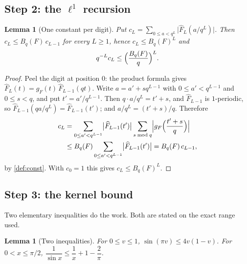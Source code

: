 \documentclass[11pt]{amsart}
\newtheorem{lemma}[theorem]{Lemma}
\theoremstyle{definition}
\theoremstyle{remark}
\begin{document}
\subsection*{Step 2: the $\ell^1$ recursion}

\begin{lemma}[One constant per digit]
\label{lem:l1}
Put $c_L = \sum_{0 \le a < q^L} \bigl| \widehat F_L(a/q^L) \bigr|$. Then $c_L \le B_q(F)\, c_{L-1}$ for every $L \ge 1$, hence $c_L \le B_q(F)^L$ and
\[
  q^{-L} c_L \le \Bigl( \frac{B_q(F)}{q} \Bigr)^{L} .
\]
\end{lemma}

\begin{proof}
Peel the digit at position $0$: the product formula gives $\widehat F_L(t) = g_F(t)\, \widehat F_{L-1}(qt)$. Write $a = a' + s q^{L-1}$ with $0 \le a' < q^{L-1}$ and $0 \le s < q$, and put $t' = a'/q^{L-1}$. Then $q \cdot a/q^L = t' + s$, and $\widehat F_{L-1}$ is $1$-periodic, so $\widehat F_{L-1}(q a / q^L) = \widehat F_{L-1}(t')$; and $a/q^L = (t' + s)/q$. Therefore
\begin{align*}
  c_L &= \sum_{0 \le a' < q^{L-1}} \bigl| \widehat F_{L-1}(t') \bigr| \sum_{s \bmod q} \Bigl| g_F\Bigl( \frac{t' + s}{q} \Bigr) \Bigr| \\
  &\le B_q(F) \sum_{0 \le a' < q^{L-1}} \bigl| \widehat F_{L-1}(t') \bigr| = B_q(F)\, c_{L-1},
\end{align*}
by \cref{def:const}. With $c_0 = 1$ this gives $c_L \le B_q(F)^L$.
\end{proof}

\subsection*{Step 3: the kernel bound}

Two elementary inequalities do the work. Both are stated on the exact range used.

\begin{lemma}[Two inequalities]
\label{lem:elem}
For $0 \le v \le 1$, $\sin(\pi v) \le 4v(1-v)$. For $0 < x \le \pi/2$, $\dfrac{1}{\sin x} \le \dfrac1x + 1 - \dfrac{2}{\pi}$.
\end{lemma}
\end{document}
